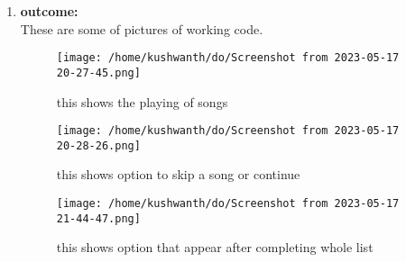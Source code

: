 \documentclass[journal,12pt,onecolumn]{IEEEtran}
\theoremstyle{remark}
\begin{document}
\begin{enumerate}
 \item \large{\textbf{outcome:}}\\
 These are some of pictures of working code.
 \begin{figure}[h]
 \centering
 \texttt{[image: /home/kushwanth/do/Screenshot from 2023-05-17 20-27-45.png]}
 \caption{\large{this shows the playing of songs}}
 \end{figure}
 \begin{figure}
 \centering
 \texttt{[image: /home/kushwanth/do/Screenshot from 2023-05-17 20-28-26.png]}
 \caption{\large{this shows option to skip a song or continue}}
 \end{figure}
 \begin{figure}
 \centering
 \texttt{[image: /home/kushwanth/do/Screenshot from 2023-05-17 21-44-47.png]}
 \caption{\large{this shows option that appear after completing whole list}}
 \end{figure}
\end{enumerate}
\end{document}
